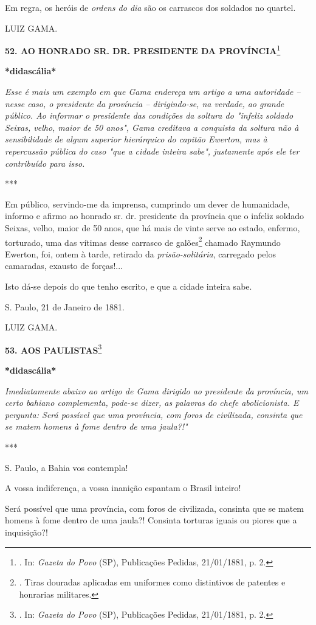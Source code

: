 Em regra, os heróis de \emph{ordens do dia} são os carrascos dos
soldados no quartel.

LUIZ GAMA.

\textbf{52. AO HONRADO SR. DR. PRESIDENTE DA PROVÍNCIA}\footnote{. In:
  \emph{Gazeta do Povo} (SP), Publicações Pedidas, 21/01/1881, p. 2.}

\textbf{*didascália*}

\emph{Esse é mais um exemplo em que Gama endereça um artigo a uma
autoridade -- nesse caso, o presidente da província -- dirigindo-se, na
verdade, ao grande público. Ao informar o presidente das condições da
soltura do "infeliz soldado Seixas, velho, maior de 50 anos", Gama
creditava a conquista da soltura não à sensibilidade de algum superior
hierárquico do capitão Ewerton, mas à repercussão pública do caso "que a
cidade inteira sabe", justamente após ele ter contribuído para isso.}

***

Em público, servindo-me da imprensa, cumprindo um dever de humanidade,
informo e afirmo ao honrado sr. dr. presidente da província que o
infeliz soldado Seixas, velho, maior de 50 anos, que há mais de vinte
serve ao estado, enfermo, torturado, uma das vítimas desse carrasco de
galões\footnote{. Tiras douradas aplicadas em uniformes como distintivos
  de patentes e honrarias militares.}
chamado Raymundo Ewerton,
foi, ontem à tarde, retirado da \emph{prisão-solitária}, carregado pelos
camaradas, exausto de forças!...

Isto dá-se depois do que tenho escrito, e que a cidade inteira sabe.

S. Paulo, 21 de Janeiro de 1881.

LUIZ GAMA.

\textbf{53. AOS PAULISTAS}\footnote{. In: \emph{Gazeta do Povo} (SP),
  Publicações Pedidas, 21/01/1881, p. 2.}

\textbf{*}\textbf{didascália*}

\emph{Imediatamente abaixo ao artigo de Gama dirigido ao presidente da
província, um certo bahiano complementa, pode-se dizer, as palavras do
chefe abolicionista. E pergunta: Será possível que uma província, com
foros de civilizada, consinta que se matem homens à fome dentro de uma
jaula?!" }

***

S. Paulo, a Bahia vos contempla!

A vossa indiferença, a vossa inanição espantam o Brasil inteiro!

Será possível que uma província, com foros de civilizada, consinta que
se matem homens à fome dentro de uma jaula?! Consinta torturas iguais ou
piores que a inquisição?!

